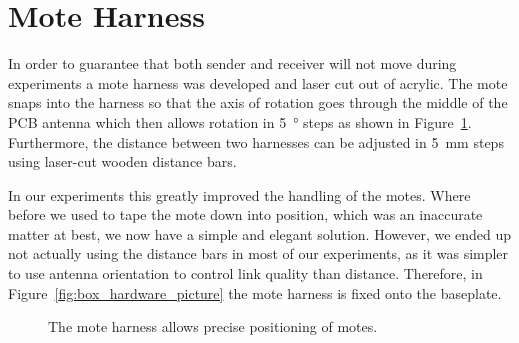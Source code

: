 \section{Mote Harness}
\label{sec:mote_harness}

In order to guarantee that both sender and receiver will not move during experiments a mote harness was developed and laser cut out of acrylic.
The mote snaps into the harness so that the axis of rotation goes through the middle of the PCB antenna which then allows rotation in \SI{5}{\degree} steps as shown in Figure~\ref{fig:mote_harness}.
Furthermore, the distance between two harnesses can be adjusted in \SI{5}{\milli\metre} steps using laser-cut wooden distance bars.

In our experiments this greatly improved the handling of the motes. Where before we used to tape the mote down into position, which was an inaccurate matter at best, we now have a simple and elegant solution.
However, we ended up not actually using the distance bars in most of our experiments, as it was simpler to use antenna orientation to control link quality than distance.
Therefore, in Figure~\ref{fig:box_hardware_picture} the mote harness is fixed onto the baseplate.

\begin{figure}[t]
	\caption{The mote harness allows precise positioning of motes.}
	\label{fig:mote_harness}
\end{figure}

